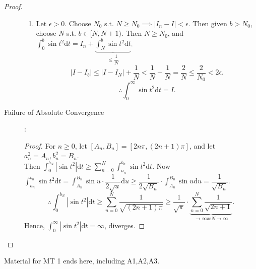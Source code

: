 \begin{example}[1]
\begin{proof}
\begin{description}
\begin{enumerate}
				      \item Let $\epsilon>0$. Choose $N_0$ s.t. $N\ge N_0\implies \left|I_n-I\right|<\epsilon$.
				            Then given $b> N_0$, choose $N$ s.t. $b \in [N,N+1)$.
				            Then $N\ge N_0$, and $\int_{0}^{b}{\sin{t^2}\mathrm{d}t}=I_n+ \underbrace{\int_{N}^{b}{\sin{t^2}\mathrm{d}t}}_{\le \dfrac{1}{N}}$.
				            \[
					            \left|I-I_b\right| \le \left|I-I_N\right|+\dfrac{1}{N} <\dfrac{1}{N}+\dfrac{1}{N}= \dfrac{2}{N}\le \dfrac{2}{N_0} <2 \epsilon
					            .\]
				            \[
					            \therefore \int_{0}^{\infty}{\sin{t^2}\mathrm{d}t}=I
					            .\]
			      \end{enumerate}
			\item[Failure of Absolute Convergence]:
			      \begin{proof}
				      For $n\ge 0$, let $[A_n,B_{n}]=[2n\pi,(2n+1)\pi]$, and let $a_n^2=A_n,b_{n}^{2}=B_n$.\\
				      Then $\int_{0}^{b_N}{\left|\sin{t^2}\right|\mathrm{d}t}\ge \sum_{n=0}^{N}{\int_{a_n}^{b_n}{\sin{t^2}\mathrm{d}t}}$.
				      Now $\int_{a_n}^{b_n}{\sin{t^2}\mathrm{d}t}=\int_{A_n}^{B_n}{\sin{u}\cdot \dfrac{1}{2 \sqrt{u}}\mathrm{d}u}\ge \dfrac{1}{2 \sqrt{B_n}} \cdot  \int_{A_n}^{B_n}{\sin{u}\mathrm{d}u}=\dfrac{1}{\sqrt{B_n}}$.
				      \[
					      \therefore \int_{0}^{b_N}{\left|\sin{t^2}\right|\mathrm{d}t}\ge \sum_{n=0}^{N}{\dfrac{1}{\sqrt{(2n+1)\pi}}}\ge \dfrac{1}{\sqrt{\pi}}\cdot  \underbrace{\sum_{n=0}^{N}{\dfrac{1}{\sqrt{2n+1}}}}_{\to \infty \text{as} N\to \infty}
					      .\]
				      Hence, $\int_{0}^{\infty}{\left|\sin{t^2}\right|\mathrm{d}t}=\infty$, diverges.
			      \end{proof}
		\end{description}
	\end{proof}
\end{example}

\begin{note}
	Material for MT 1 ends here, including A1,A2,A3.
\end{note}
